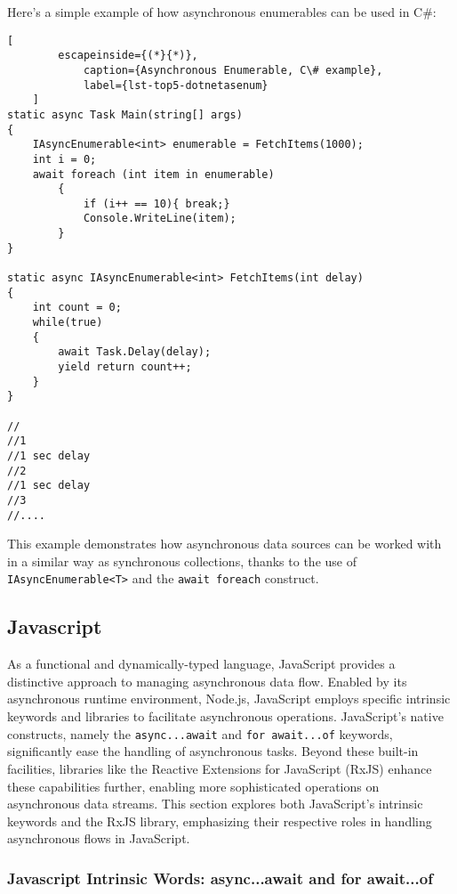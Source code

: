 Here's a simple example of how asynchronous enumerables can be used in C\#:

\begin{center}
	\lstset{basicstyle=\scriptsize\ttfamily,frame=bottomline}
	\begin{lstlisting}[
		escapeinside={(*}{*)},
			caption={Asynchronous Enumerable, C\# example},
			label={lst-top5-dotnetasenum}
	]
static async Task Main(string[] args)
{
	IAsyncEnumerable<int> enumerable = FetchItems(1000);
	int i = 0;
	await foreach (int item in enumerable)
		{
			if (i++ == 10){ break;}
			Console.WriteLine(item);
		}
}

static async IAsyncEnumerable<int> FetchItems(int delay)
{
	int count = 0;
	while(true)
	{
		await Task.Delay(delay);
		yield return count++;
	}
}

//
//1
//1 sec delay
//2
//1 sec delay
//3
//....

	\end{lstlisting}
\end{center}

This example demonstrates how asynchronous data sources can be worked with in a similar way as synchronous collections, thanks to the use of \texttt{IAsyncEnumerable<T>} and the \texttt{await foreach} construct.

\subsection{Javascript}
\label{jsae}

As a functional and dynamically-typed language, JavaScript provides a distinctive approach to managing asynchronous data flow. Enabled by its asynchronous runtime environment, Node.js, JavaScript employs specific intrinsic keywords and libraries to facilitate asynchronous operations. JavaScript's native constructs, namely the \texttt{async...await} and \texttt{for await...of} keywords, significantly ease the handling of asynchronous tasks. Beyond these built-in facilities, libraries like the Reactive Extensions for JavaScript (RxJS) enhance these capabilities further, enabling more sophisticated operations on asynchronous data streams. This section explores both JavaScript's intrinsic keywords and the RxJS library, emphasizing their respective roles in handling asynchronous flows in JavaScript.

\subsubsection{Javascript Intrinsic Words: async...await and for await...of}
\label{jsintrin}

